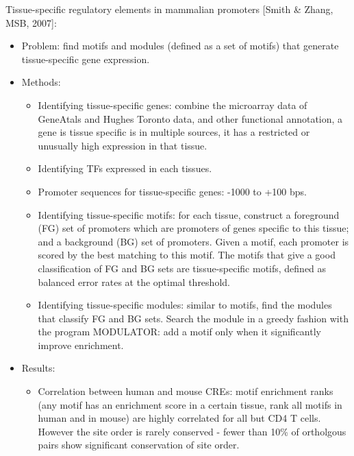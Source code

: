 \documentclass{report}
\begin{document}
\begin{enumerate}
	Tissue-specific regulatory elements in mammalian promoters [Smith \& Zhang, MSB, 2007]:
	\begin{itemize}
		\item Problem: find motifs and modules (defined as a set of motifs) that generate tissue-specific gene expression. 
		
		\item Methods:
		\begin{itemize}
			
			\item Identifying tissue-specific genes: combine the microarray data of GeneAtals and Hughes Toronto data, and other functional annotation, a gene is tissue specific is in multiple sources, it has a restricted or unusually high expression in that tissue. 
			
			\item Identifying TFs expressed in each tissues. 
			
			\item Promoter sequences for tissue-specific genes: -1000 to +100 bps. 
			
			\item Identifying tissue-specific motifs: for each tissue, construct a foreground (FG) set of promoters which are promoters of genes specific to this tissue; and a background (BG) set of promoters. Given a motif, each promoter is scored by the best matching to this motif. The motifs that give a good classification of FG and BG sets are tissue-specific motifs, defined as balanced error rates at the optimal threshold. 
			
			\item Identifying tissue-specific modules: similar to motifs, find the modules that classify FG and BG sets. Search the module in a greedy fashion with the program MODULATOR: add a motif only when it significantly improve enrichment. 
			
		\end{itemize}
		
		\item Results: 
		\begin{itemize}
			\item Correlation between human and mouse CREs: motif enrichment ranks (any motif has an enrichment score in a certain tissue, rank all motifs in human and in mouse) are highly correlated for all but CD4 T cells. However the site order is rarely conserved - fewer than 10\% of ortholgous pairs show significant conservation of site order. 
		\end{itemize}
	\end{itemize}
	

\end{enumerate}
\end{document}
